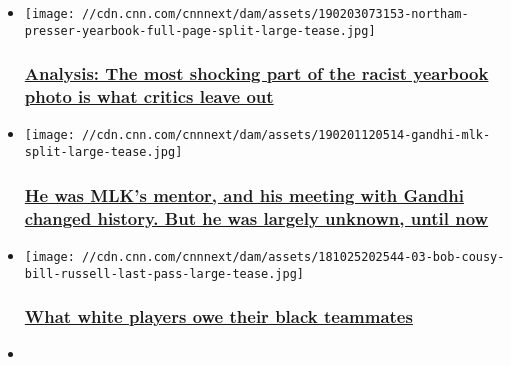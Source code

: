\begin{itemize}
\item
  \href{/2019/02/03/us/racist-photo-northam-blake-analysis/index.html}{}

  \texttt{[image: //cdn.cnn.com/cnnnext/dam/assets/190203073153-northam-presser-yearbook-full-page-split-large-tease.jpg]}

  \hypertarget{analysis-the-most-shocking-part-of-the-racist-yearbook-photo-is-what-critics-leave-out}{%
  \subsubsection{\texorpdfstring{\href{/2019/02/03/us/racist-photo-northam-blake-analysis/index.html}{Analysis:
  The most shocking part of the racist yearbook photo is what critics
  leave
  out}}{Analysis: The most shocking part of the racist yearbook photo is what critics leave out}}\label{analysis-the-most-shocking-part-of-the-racist-yearbook-photo-is-what-critics-leave-out}}
\item
  \href{/2019/02/01/us/howard-thurman-mlk-gandhi/index.html}{}

  \texttt{[image: //cdn.cnn.com/cnnnext/dam/assets/190201120514-gandhi-mlk-split-large-tease.jpg]}

  \hypertarget{he-was-mlks-mentor-and-his-meeting-with-gandhi-changed-history-but-he-was-largely-unknown-until-now}{%
  \subsubsection{\texorpdfstring{\href{/2019/02/01/us/howard-thurman-mlk-gandhi/index.html}{He
  was MLK's mentor, and his meeting with Gandhi changed history. But he
  was largely unknown, until
  now}}{He was MLK's mentor, and his meeting with Gandhi changed history. But he was largely unknown, until now}}\label{he-was-mlks-mentor-and-his-meeting-with-gandhi-changed-history-but-he-was-largely-unknown-until-now}}
\item
  \href{/2018/10/26/us/bob-cousy-bill-russell-last-pass/index.html}{}

  \texttt{[image: //cdn.cnn.com/cnnnext/dam/assets/181025202544-03-bob-cousy-bill-russell-last-pass-large-tease.jpg]}

  \hypertarget{what-white-players-owe-their-black-teammates}{%
  \subsubsection{\texorpdfstring{\href{/2018/10/26/us/bob-cousy-bill-russell-last-pass/index.html}{What
  white players owe their black
  teammates}}{What white players owe their black teammates}}\label{what-white-players-owe-their-black-teammates}}
\item
  \href{/2018/09/29/us/polite-racism/index.html}{}


\end{itemize}
